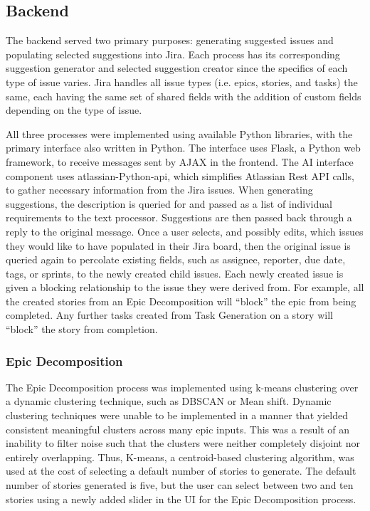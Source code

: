 \subsection{Backend}

The backend served two primary purposes: generating suggested issues and populating selected suggestions into Jira. Each process has its corresponding suggestion generator and selected suggestion creator since the specifics of each type of issue varies. Jira handles all issue types (i.e. epics, stories, and tasks) the same, each having the same set of shared fields with the addition of custom fields depending on the type of issue.

All three processes were implemented using available Python libraries, with the primary interface also written in Python. The interface uses Flask\cite{flask}, a Python web framework, to receive messages sent by AJAX in the frontend. The AI interface component uses atlassian-Python-api\cite{jiraPython}, which simplifies Atlassian Rest API\cite{jira5} calls, to gather necessary information from the Jira issues. When generating suggestions, the description is queried for and passed as a list of individual requirements to the text processor. Suggestions are then passed back through a reply to the original message. Once a user selects, and possibly edits, which issues they would like to have populated in their Jira board, then the original issue is queried again to percolate existing fields, such as assignee, reporter, due date, tags, or sprints, to the newly created child issues. Each newly created issue is given a blocking relationship to the issue they were derived from. For example, all the created stories from an Epic Decomposition will “block” the epic from being completed. Any further tasks created from Task Generation on a story will “block” the story from completion.

\subsubsection{Epic Decomposition}
The Epic Decomposition process was implemented using k-means clustering over a dynamic clustering technique, such as DBSCAN or Mean shift. Dynamic clustering techniques were unable to be implemented in a manner that yielded consistent meaningful clusters across many epic inputs. This was a result of an inability to filter noise such that the clusters were neither completely disjoint nor entirely overlapping. Thus, K-means, a centroid-based clustering algorithm, was used at the cost of selecting a default number of stories to generate. The default number of stories generated is five, but the user can select between two and ten stories using a newly added slider in the UI for the Epic Decomposition process.

